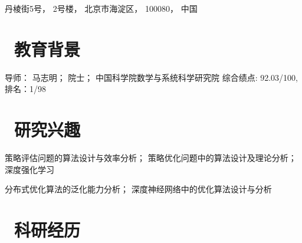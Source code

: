 \documentclass{resume}
\begin{document}


\centerline{\faMap 丹棱街5号， 2号楼， 北京市海淀区， 100080， 中国}
 
\section{\faGraduationCap\  教育背景}
导师： 马志明； 院士； 中国科学院数学与系统科学研究院
{综合绩点: 92.03/100, 排名：1/98}

\section{\faUsers\ 研究兴趣}
 

 {}
策略评估问题的算法设计与效率分析； 策略优化问题中的算法设计及理论分析； 深度强化学习 

 {}
分布式优化算法的泛化能力分析； 深度神经网络中的优化算法设计与分析
 


\section{\faCogs\ 科研经历}
 
\end{document}
